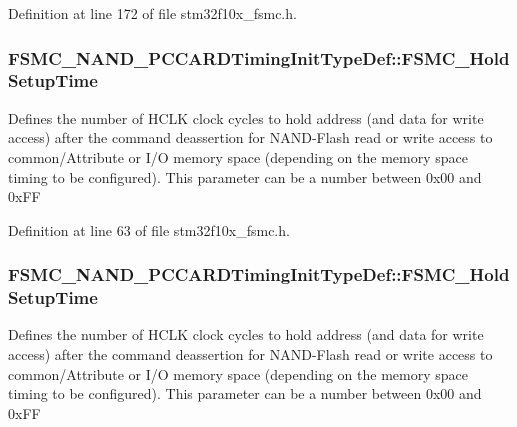 Definition at line 172 of file stm32f10x\+\_\+fsmc.\+h.

\subsubsection[{\texorpdfstring{F\+S\+M\+C\+\_\+\+Hold\+Setup\+Time}{FSMC_HoldSetupTime}}]{ F\+S\+M\+C\+\_\+\+N\+A\+N\+D\+\_\+\+P\+C\+C\+A\+R\+D\+Timing\+Init\+Type\+Def\+::\+F\+S\+M\+C\+\_\+\+Hold\+Setup\+Time}\hypertarget{struct_f_s_m_c___n_a_n_d___p_c_c_a_r_d_timing_init_type_def_a3d7403ba2728c0cb841d1b58877843c8}{}\label{struct_f_s_m_c___n_a_n_d___p_c_c_a_r_d_timing_init_type_def_a3d7403ba2728c0cb841d1b58877843c8}
Defines the number of H\+C\+LK clock cycles to hold address (and data for write access) after the command deassertion for N\+A\+N\+D-\/\+Flash read or write access to common/\+Attribute or I/O memory space (depending on the memory space timing to be configured). This parameter can be a number between 0x00 and 0x\+FF 

Definition at line 63 of file stm32f10x\+\_\+fsmc.\+h.

\subsubsection[{\texorpdfstring{F\+S\+M\+C\+\_\+\+Hold\+Setup\+Time}{FSMC_HoldSetupTime}}]{ F\+S\+M\+C\+\_\+\+N\+A\+N\+D\+\_\+\+P\+C\+C\+A\+R\+D\+Timing\+Init\+Type\+Def\+::\+F\+S\+M\+C\+\_\+\+Hold\+Setup\+Time}\hypertarget{struct_f_s_m_c___n_a_n_d___p_c_c_a_r_d_timing_init_type_def_ae2b53c2cfd55ff277f453613dcf7c8b2}{}\label{struct_f_s_m_c___n_a_n_d___p_c_c_a_r_d_timing_init_type_def_ae2b53c2cfd55ff277f453613dcf7c8b2}
Defines the number of H\+C\+LK clock cycles to hold address (and data for write access) after the command deassertion for N\+A\+N\+D-\/\+Flash read or write access to common/\+Attribute or I/O memory space (depending on the memory space timing to be configured). This parameter can be a number between 0x00 and 0x\+FF 

